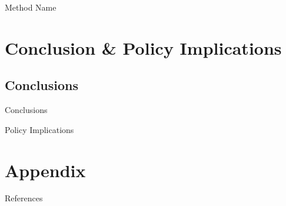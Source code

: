 \documentclass[10pt]{beamer}
\begin{document}
\begin{frame}{Method Name}
\small 
\linespread{1.25}

\end{frame}





\section{Conclusion \& Policy Implications}

\subsection{Conclusions}

\begin{frame}{Conclusions}
\linespread{1.5}

\end{frame}


\begin{frame}{Policy Implications}
\linespread{1.5}

\end{frame} 


\begin{frame}
\end{frame} %




\appendix 

\section{Appendix}

\begin{frame}{}
\end{frame}



\begin{frame}[allowframebreaks]{References} 
\footnotesize
	
%
\end{frame}
\end{document}
